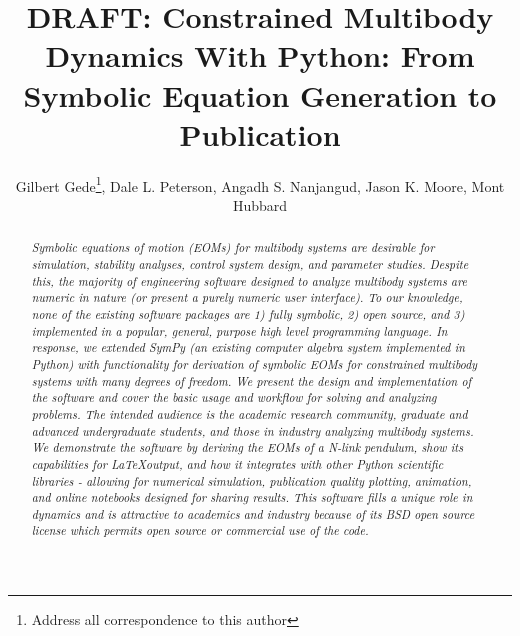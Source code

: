 \documentclass[twocolumn,10pt]{asme2e}
\title{DRAFT: Constrained Multibody Dynamics With Python: From Symbolic
Equation Generation to Publication}
\author{Gilbert Gede\thanks{Address all correspondence to this author}, Dale L.
Peterson, Angadh S. Nanjangud, Jason K. Moore, Mont Hubbard
  \affiliation{
    Sports Biomechanics Laboratory\\
    Department of Mechanical and Aerospace Engineering\\
    University of California\\
    Davis, California 95616\\
    Email: \{ggede, dlpeterson, asnanjangud, jkmoor, mhubbard\}@ucdavis.edu
  }
}
\begin{document}
\maketitle

\begin{abstract}
\it Symbolic equations of motion (EOMs) for multibody systems are desirable
for simulation, stability analyses, control system design, and parameter
studies.
Despite this, the majority of engineering software designed to analyze
multibody systems are numeric in nature (or present a purely numeric user
interface). To our knowledge, none of the existing software packages are 1)
fully symbolic, 2) open source, and 3) implemented in a popular, general,
purpose high level programming language.
In response, we extended SymPy (an existing computer algebra system implemented
in Python) with functionality for derivation of symbolic EOMs for constrained
multibody systems with many degrees of freedom.
We present the design and implementation of the software and cover the basic
usage and workflow for solving and analyzing problems. The intended audience is
the academic research community, graduate and advanced undergraduate students,
and those in industry analyzing multibody systems.
We demonstrate the software by deriving the EOMs of a N-link pendulum, show its
capabilities for \LaTeX output, and how it integrates with other Python
scientific libraries - allowing for numerical simulation, publication quality
plotting, animation, and online notebooks designed for sharing results.
This software fills a unique role in dynamics and is attractive to academics
and industry because of its BSD open source license which permits open source
or commercial use of the code.

\end{abstract}

\end{document}
